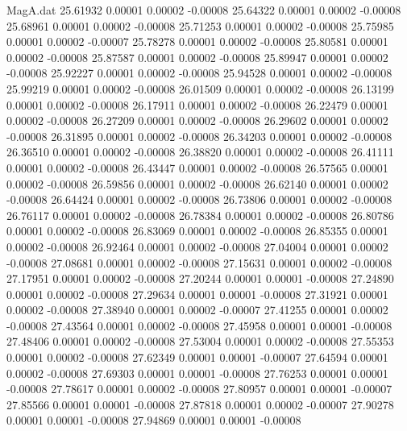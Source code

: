 \begin{filecontents}{MagA.dat}
  25.61932    0.00001    0.00002   -0.00008
  25.64322    0.00001    0.00002   -0.00008
  25.68961    0.00001    0.00002   -0.00008
  25.71253    0.00001    0.00002   -0.00008
  25.75985    0.00001    0.00002   -0.00007
  25.78278    0.00001    0.00002   -0.00008
  25.80581    0.00001    0.00002   -0.00008
  25.87587    0.00001    0.00002   -0.00008
  25.89947    0.00001    0.00002   -0.00008
  25.92227    0.00001    0.00002   -0.00008
  25.94528    0.00001    0.00002   -0.00008
  25.99219    0.00001    0.00002   -0.00008
  26.01509    0.00001    0.00002   -0.00008
  26.13199    0.00001    0.00002   -0.00008
  26.17911    0.00001    0.00002   -0.00008
  26.22479    0.00001    0.00002   -0.00008
  26.27209    0.00001    0.00002   -0.00008
  26.29602    0.00001    0.00002   -0.00008
  26.31895    0.00001    0.00002   -0.00008
  26.34203    0.00001    0.00002   -0.00008
  26.36510    0.00001    0.00002   -0.00008
  26.38820    0.00001    0.00002   -0.00008
  26.41111    0.00001    0.00002   -0.00008
  26.43447    0.00001    0.00002   -0.00008
  26.57565    0.00001    0.00002   -0.00008
  26.59856    0.00001    0.00002   -0.00008
  26.62140    0.00001    0.00002   -0.00008
  26.64424    0.00001    0.00002   -0.00008
  26.73806    0.00001    0.00002   -0.00008
  26.76117    0.00001    0.00002   -0.00008
  26.78384    0.00001    0.00002   -0.00008
  26.80786    0.00001    0.00002   -0.00008
  26.83069    0.00001    0.00002   -0.00008
  26.85355    0.00001    0.00002   -0.00008
  26.92464    0.00001    0.00002   -0.00008
  27.04004    0.00001    0.00002   -0.00008
  27.08681    0.00001    0.00002   -0.00008
  27.15631    0.00001    0.00002   -0.00008
  27.17951    0.00001    0.00002   -0.00008
  27.20244    0.00001    0.00001   -0.00008
  27.24890    0.00001    0.00002   -0.00008
  27.29634    0.00001    0.00001   -0.00008
  27.31921    0.00001    0.00002   -0.00008
  27.38940    0.00001    0.00002   -0.00007
  27.41255    0.00001    0.00002   -0.00008
  27.43564    0.00001    0.00002   -0.00008
  27.45958    0.00001    0.00001   -0.00008
  27.48406    0.00001    0.00002   -0.00008
  27.53004    0.00001    0.00002   -0.00008
  27.55353    0.00001    0.00002   -0.00008
  27.62349    0.00001    0.00001   -0.00007
  27.64594    0.00001    0.00002   -0.00008
  27.69303    0.00001    0.00001   -0.00008
  27.76253    0.00001    0.00001   -0.00008
  27.78617    0.00001    0.00002   -0.00008
  27.80957    0.00001    0.00001   -0.00007
  27.85566    0.00001    0.00001   -0.00008
  27.87818    0.00001    0.00002   -0.00007
  27.90278    0.00001    0.00001   -0.00008
  27.94869    0.00001    0.00001   -0.00008

\end{filecontents}
